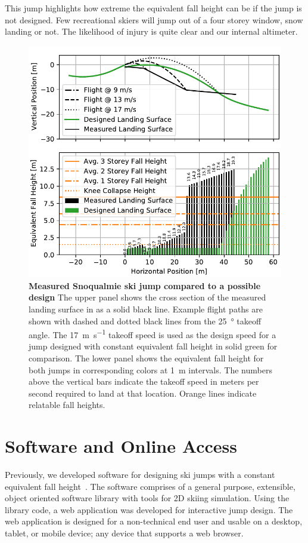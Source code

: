 \documentclass{article}
\begin{document}
This jump highlights how extreme the equivalent fall height can be if the jump
is not designed. Few recreational skiers will jump out of a four storey window,
snow landing or not. The likelihood of injury is quite clear and our internal
altimeter.
%
\begin{figure}
  \centering
  \includegraphics[width=5.25in]{figures/salvini-v-snoqualmie.pdf}
  \caption{\textbf{Measured Snoqualmie ski jump compared to a possible design}
  The upper panel shows the cross section of the measured landing surface in as
  a solid black line. Example flight paths are shown with dashed and dotted
  black lines from the 25~\si{\degree} takeoff angle. The
  17~\si{\meter\per\second} takeoff speed is used as the design speed for a
  jump designed with constant equivalent fall height in solid green for
  comparison. The lower panel shows the equivalent fall height for both jumps
  in corresponding colors at 1~\si{\meter} intervals. The numbers above the
  vertical bars indicate the takeoff speed in meters per second required to
  land at that location. Orange lines indicate relatable fall heights.}
  \label{fig:salvini-v-snoqualmie}
\end{figure}

\section{Software and Online Access}
%
Previously, we developed software for designing ski jumps with a constant
equivalent fall height~\cite{Moore2018}. The software comprises of a general
purpose, extensible, object oriented software library with tools for 2D skiing
simulation. Using the library code, a web application was developed for
interactive jump design. The web application is designed for a non-technical
end user and usable on a desktop, tablet, or mobile device; any device that
supports a web browser.
\end{document}
